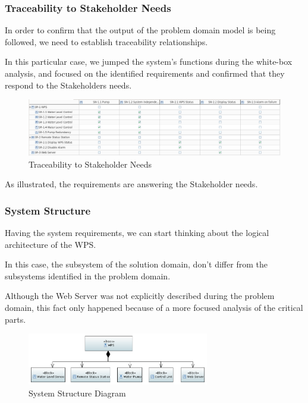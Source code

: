 \documentclass[11pt]{article}
\begin{document}
\newpage

\subsubsection{Traceability to Stakeholder Needs}

In order to confirm that the output of the problem domain model is being followed, we need to establish traceability relationships. 

In this particular case, we jumped the system's functions during the white-box analysis, and focused on the identified requirements and confirmed that they respond to the Stakeholders needs.

\begin{figure}[H]
  \centering
  \includegraphics[width=\linewidth]{../diagrams/traceability.png}
  \caption{Traceability to Stakeholder Needs}
  \label{fig:Traceability}
\end{figure}

As illustrated, the requirements are answering the Stakeholder needs.

\subsubsection{System Structure}

Having the system requirements, we can start thinking about the logical architecture of the WPS.

In this case, the subsystem of the solution domain, don't differ from the subsystems identified in the problem domain. 

Although the Web Server was not explicitly described during the problem domain, this fact only happened because of a more focused analysis of the critical parts.

\begin{figure}[H]
  \centering
  \includegraphics[width=300px]{../diagrams/system-structure.png}
  \caption{System Structure Diagram}
  \label{fig:System Structure Diagram}
\end{figure}
\end{document}

